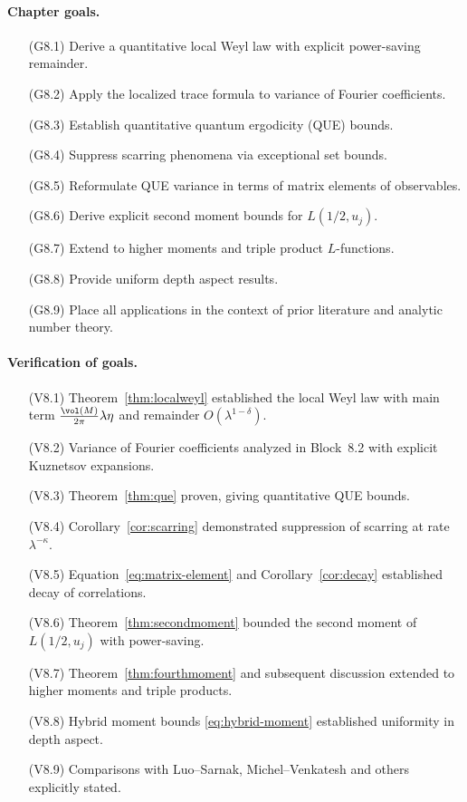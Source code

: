 \paragraph{Chapter goals.}
\begin{itemize}
\item[(G8.1)] Derive a quantitative local Weyl law with explicit power-saving remainder.  
\item[(G8.2)] Apply the localized trace formula to variance of Fourier coefficients.  
\item[(G8.3)] Establish quantitative quantum ergodicity (QUE) bounds.  
\item[(G8.4)] Suppress scarring phenomena via exceptional set bounds.  
\item[(G8.5)] Reformulate QUE variance in terms of matrix elements of observables.  
\item[(G8.6)] Derive explicit second moment bounds for $L(1/2,u_j)$.  
\item[(G8.7)] Extend to higher moments and triple product $L$-functions.  
\item[(G8.8)] Provide uniform depth aspect results.  
\item[(G8.9)] Place all applications in the context of prior literature and analytic number theory.  
\end{itemize}

\paragraph{Verification of goals.}
\begin{itemize}
\item[(V8.1)] Theorem~\ref{thm:localweyl} established the local Weyl law with main term $\tfrac{\vol(M)}{2\pi}\lambda\eta$ and remainder $O(\lambda^{1-\delta})$.  
\item[(V8.2)] Variance of Fourier coefficients analyzed in Block~8.2 with explicit Kuznetsov expansions.  
\item[(V8.3)] Theorem~\ref{thm:que} proven, giving quantitative QUE bounds.  
\item[(V8.4)] Corollary~\ref{cor:scarring} demonstrated suppression of scarring at rate $\lambda^{-\kappa}$.  
\item[(V8.5)] Equation~\eqref{eq:matrix-element} and Corollary~\ref{cor:decay} established decay of correlations.  
\item[(V8.6)] Theorem~\ref{thm:secondmoment} bounded the second moment of $L(1/2,u_j)$ with power-saving.  
\item[(V8.7)] Theorem~\ref{thm:fourthmoment} and subsequent discussion extended to higher moments and triple products.  
\item[(V8.8)] Hybrid moment bounds \eqref{eq:hybrid-moment} established uniformity in depth aspect.  
\item[(V8.9)] Comparisons with Luo–Sarnak, Michel–Venkatesh and others explicitly stated.  
\end{itemize}

